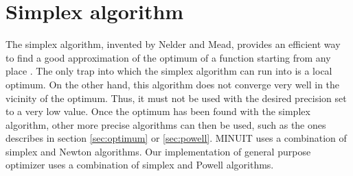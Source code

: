 \section{Simplex algorithm}
\label{sec:simplex} The simplex algorithm, invented by Nelder and
Mead, provides an efficient way to find a good approximation of
the optimum of a function starting from any place \cite{Press}.
The only trap into which the simplex algorithm can run into is a
local optimum. On the other hand, this algorithm does not converge
very well in the vicinity of the optimum. Thus, it must not be
used with the desired precision set to a very low value. Once the
optimum has been found with the simplex algorithm, other more
precise algorithms can then be used, such as the ones describes in
section \ref{sec:optimum} or \ref{sec:powell}. MINUIT uses a
combination of simplex and Newton algorithms. Our implementation
of general purpose optimizer uses a combination of simplex and
Powell algorithms.

